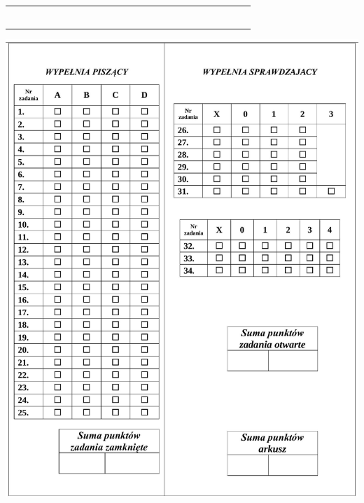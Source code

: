 \documentclass[10pt]{article}
\begin{document}
\begin{center}
\begin{tabular}{|c|c|c|c|c|c|c|c|c|c|c|c|c|c|c|c|c|c|c|c|c|c|c|c|c|}
\hline
 &  &  &  &  &  &  &  &  &  &  &  &  &  &  &  &  &  &  &  &  &  &  &  &  \\
\hline
 &  &  &  &  &  &  &  &  &  &  &  &  &  &  &  &  &  &  &  &  &  &  &  &  \\
\hline
 &  &  &  &  &  &  &  &  &  &  &  &  &  &  &  &  &  &  &  &  &  &  &  &  \\
\hline
 &  &  &  &  &  &  &  &  &  &  &  &  &  &  &  &  &  &  &  &  &  &  &  &  \\
\hline
 &  &  &  &  &  &  &  &  &  &  &  &  &  &  &  &  &  &  &  &  &  &  &  &  \\
\hline
 &  &  &  &  &  &  &  &  &  &  &  &  &  &  &  &  &  &  &  &  &  &  &  &  \\
\hline
 &  &  &  &  &  &  &  &  &  &  &  &  &  &  &  &  &  &  &  &  &  &  &  &  \\
\hline
\end{tabular}
\end{center}

\begin{center}
\includegraphics[max width=\textwidth]{2024_11_21_23d228cacd5e4a9a3f86g-16}
\end{center}
\end{document}
